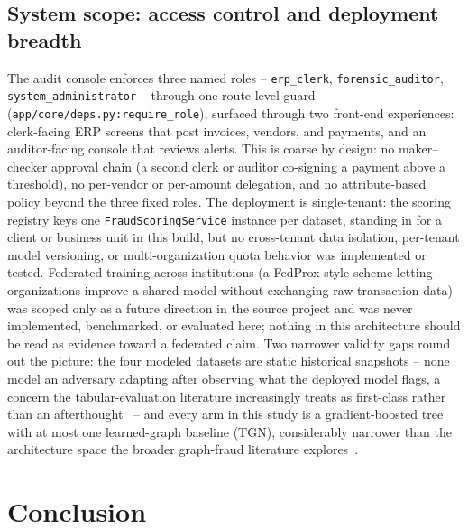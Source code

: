 \subsection{System scope: access control and deployment breadth}
The audit console enforces three named roles -- \texttt{erp\_clerk},
\texttt{forensic\_auditor}, \texttt{system\_administrator} -- through one
route-level guard (\texttt{app/core/deps.py:require\_role}), surfaced through
two front-end experiences: clerk-facing ERP screens that post invoices,
vendors, and payments, and an auditor-facing console that reviews alerts.
This is coarse by design: no maker--checker approval chain (a second clerk
or auditor co-signing a payment above a threshold), no per-vendor or
per-amount delegation, and no attribute-based policy beyond the three fixed
roles. The deployment is single-tenant: the scoring registry keys one
\texttt{FraudScoringService} instance per dataset, standing in for a client
or business unit in this build, but no cross-tenant data isolation,
per-tenant model versioning, or multi-organization quota behavior was
implemented or tested. Federated training across institutions (a
FedProx-style scheme letting organizations improve a shared model without
exchanging raw transaction data) was scoped only as a future direction in
the source project and was never implemented, benchmarked, or evaluated
here; nothing in this architecture should be read as evidence toward a
federated claim. Two narrower validity gaps round out the picture: the
four modeled datasets are static historical snapshots -- none model an
adversary adapting after observing what the deployed model flags, a concern
the tabular-evaluation literature increasingly treats as first-class rather
than an afterthought~\cite{jesus2022turning} -- and every arm in this study
is a gradient-boosted tree with at most one learned-graph baseline (TGN),
considerably narrower than the architecture space the broader graph-fraud
literature explores~\cite{motie2024gnn,yuan2025survey}.

\section{Conclusion}\label{sec:conclusion}

